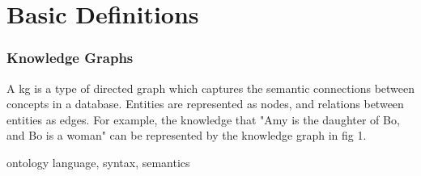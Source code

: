 \chapter{Basic Definitions}

\subsection{Knowledge Graphs}
A \gls{kg} is a type of directed graph which captures the semantic connections between concepts in a database. Entities are represented as nodes, and relations between entities as edges. For example, the knowledge that "Amy is the daughter of Bo, and Bo is a woman" can be represented by the knowledge graph in fig 1.






ontology language, syntax, semantics
